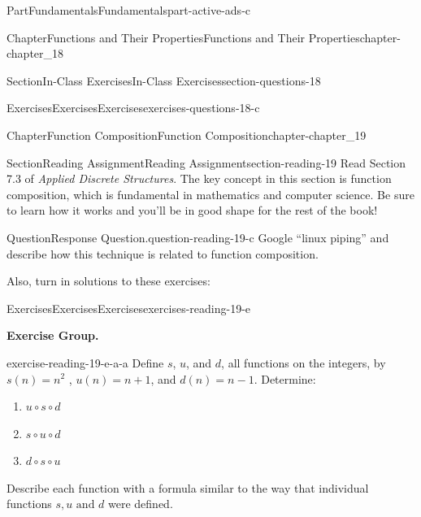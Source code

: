 \documentclass[oneside,10pt,]{book}
\numberwithin{equation}{section}
\begin{document}
\begin{partptx}{Part}{Fundamentals}{}{Fundamentals}{}{}{part-active-ads-c}
\begin{chapterptx}{Chapter}{Functions and Their Properties}{}{Functions and Their Properties}{}{}{chapter-chapter_18}
\begin{sectionptx}{Section}{In-Class Exercises}{}{In-Class Exercises}{}{}{section-questions-18}
\begin{exercises-subsection-numberless}{Exercises}{Exercises}{}{Exercises}{}{}{exercises-questions-18-c}
\par\medskip\noindent
\end{exercises-subsection-numberless}
\end{sectionptx}
\end{chapterptx}
%
\typeout{************************************************}
\typeout{************************************************}
%
\begin{chapterptx}{Chapter}{Function Composition}{}{Function Composition}{}{}{chapter-chapter_19}
\renewcommand*{\chaptername}{Chapter}
%
%
%
\typeout{************************************************}
\typeout{************************************************}
%
\begin{sectionptx}{Section}{Reading Assignment}{}{Reading Assignment}{}{}{section-reading-19}
Read Section 7.3 of \emph{Applied Discrete Structures}.  The key concept in this section is function composition, which is fundamental in mathematics and computer science. Be sure to learn how it works and you'll be in good shape for the rest of the book!%
\begin{question}{Question}{Response Question.}{question-reading-19-c}%
Google ``linux piping'' and describe how this technique is related to function composition.%
\end{question}
Also, turn in solutions to these exercises:%
%
%
\typeout{************************************************}
\typeout{************************************************}
%
\begin{exercises-subsection-numberless}{Exercises}{Exercises}{}{Exercises}{}{}{exercises-reading-19-e}
\par\medskip\noindent%
\textbf{Exercise Group.}\space\space%
\begin{exercisegroup}
\begin{divisionexerciseeg}{1}{}{}{exercise-reading-19-e-a-a}%
Define \(s\), \(u\), and \(d\), all functions on the integers, by \(s(n) = n^2\) , \(u(n) = n + 1\), and \(d(n) = n-1\). Determine:%
\begin{enumerate}[label=(\alph*)]
\item{}\(\displaystyle u \circ  s \circ  d\)%
\item{}\(\displaystyle s \circ  u\circ  d\)%
\item{}\(\displaystyle d \circ  s \circ  u\)%
\end{enumerate}
Describe each function with a formula similar to the way that individual functions \(s, u \textrm{ and } d\) were defined.%

\end{divisionexerciseeg}
\end{exercisegroup}
\end{exercises-subsection-numberless}
\end{sectionptx}
\end{chapterptx}
\end{partptx}
\end{document}
